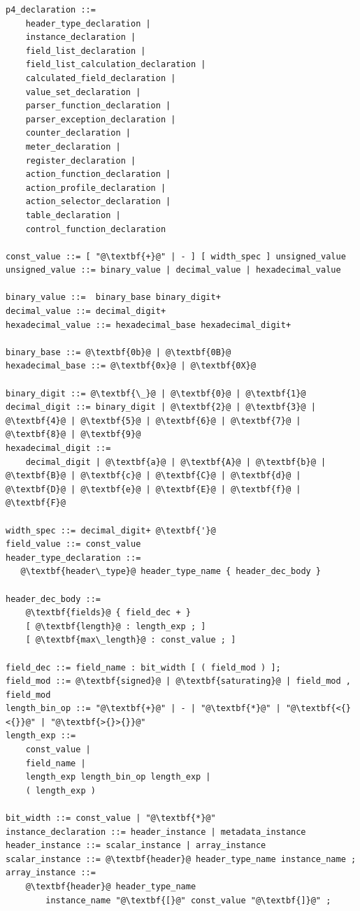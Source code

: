 \documentclass[12pt]{article}
\begin{document}
\begin{itemize}
\begin{lstlisting}[frame=single,backgroundcolor=\color{bnfgreen},escapechar=\@]
p4_declaration ::=
    header_type_declaration | 
    instance_declaration |
    field_list_declaration |
    field_list_calculation_declaration |
    calculated_field_declaration |
    value_set_declaration |
    parser_function_declaration |
    parser_exception_declaration |
    counter_declaration |
    meter_declaration |
    register_declaration |
    action_function_declaration |
    action_profile_declaration |
    action_selector_declaration |
    table_declaration |
    control_function_declaration

const_value ::= [ "@\textbf{+}@" | - ] [ width_spec ] unsigned_value
unsigned_value ::= binary_value | decimal_value | hexadecimal_value

binary_value ::=  binary_base binary_digit+
decimal_value ::= decimal_digit+
hexadecimal_value ::= hexadecimal_base hexadecimal_digit+

binary_base ::= @\textbf{0b}@ | @\textbf{0B}@
hexadecimal_base ::= @\textbf{0x}@ | @\textbf{0X}@

binary_digit ::= @\textbf{\_}@ | @\textbf{0}@ | @\textbf{1}@
decimal_digit ::= binary_digit | @\textbf{2}@ | @\textbf{3}@ | @\textbf{4}@ | @\textbf{5}@ | @\textbf{6}@ | @\textbf{7}@ | @\textbf{8}@ | @\textbf{9}@
hexadecimal_digit ::=
    decimal_digit | @\textbf{a}@ | @\textbf{A}@ | @\textbf{b}@ | @\textbf{B}@ | @\textbf{c}@ | @\textbf{C}@ | @\textbf{d}@ | @\textbf{D}@ | @\textbf{e}@ | @\textbf{E}@ | @\textbf{f}@ | @\textbf{F}@

width_spec ::= decimal_digit+ @\textbf{'}@
field_value ::= const_value
header_type_declaration ::=
   @\textbf{header\_type}@ header_type_name { header_dec_body }

header_dec_body ::=
    @\textbf{fields}@ { field_dec + }
    [ @\textbf{length}@ : length_exp ; ]
    [ @\textbf{max\_length}@ : const_value ; ]

field_dec ::= field_name : bit_width [ ( field_mod ) ];
field_mod ::= @\textbf{signed}@ | @\textbf{saturating}@ | field_mod , field_mod
length_bin_op ::= "@\textbf{+}@" | - | "@\textbf{*}@" | "@\textbf{<{}<{}}@" | "@\textbf{>{}>{}}@"
length_exp ::=
    const_value |
    field_name |
    length_exp length_bin_op length_exp |
    ( length_exp )

bit_width ::= const_value | "@\textbf{*}@"
instance_declaration ::= header_instance | metadata_instance
header_instance ::= scalar_instance | array_instance
scalar_instance ::= @\textbf{header}@ header_type_name instance_name ;
array_instance ::=
    @\textbf{header}@ header_type_name
        instance_name "@\textbf{[}@" const_value "@\textbf{]}@" ;


\end{lstlisting}
\end{itemize}
\end{document}
